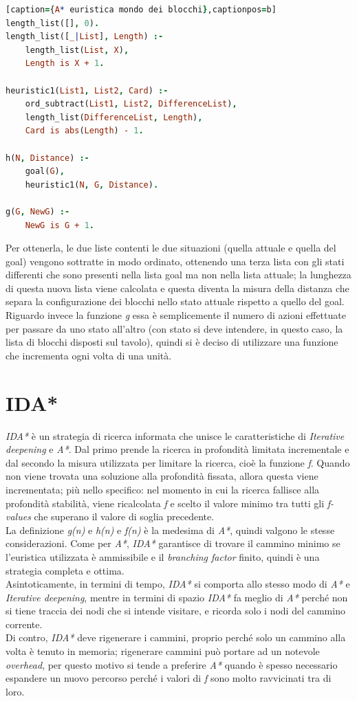 \documentclass[12pt]{report}
\begin{document}
\begin{lstlisting}[language=Prolog][caption={A* euristica mondo dei blocchi},captionpos=b]
length_list([], 0).
length_list([_|List], Length) :- 
	length_list(List, X),
	Length is X + 1.

heuristic1(List1, List2, Card) :- 
	ord_subtract(List1, List2, DifferenceList),
	length_list(DifferenceList, Length),
	Card is abs(Length) - 1.

h(N, Distance) :- 
	goal(G),
	heuristic1(N, G, Distance).

g(G, NewG) :- 
	NewG is G + 1.
\end{lstlisting}

Per ottenerla, le due liste contenti le due situazioni (quella attuale e quella del goal) vengono sottratte in modo ordinato, ottenendo una terza lista con gli stati differenti che sono presenti nella lista goal ma non nella lista attuale; la lunghezza di questa nuova lista viene calcolata e questa diventa la misura della distanza che separa la configurazione dei blocchi nello stato attuale rispetto a quello del goal.
Riguardo invece la funzione \emph{g} essa è semplicemente il numero di azioni effettuate per passare da uno stato all'altro (con stato si deve intendere, in questo caso, la lista di blocchi disposti sul tavolo), quindi si è deciso di utilizzare una funzione che incrementa ogni volta di una unità.

\section{IDA*}
\emph{IDA*} è un strategia di ricerca informata che unisce le caratteristiche di \emph{Iterative deepening} e \emph{A*}. Dal primo prende la ricerca in profondità limitata incrementale e dal secondo la misura utilizzata per limitare la ricerca, cioè la funzione \emph{f}. Quando non viene trovata una soluzione alla profondità fissata, allora questa viene incrementata; più nello specifico: nel momento in cui la ricerca fallisce alla profondità stabilità, viene ricalcolata \emph{f} e scelto il valore minimo tra tutti gli \emph{f-values} che superano il valore di soglia precedente.\\
La definizione \emph{g(n)} e \emph{h(n)} e \emph{f(n)} è la medesima di \emph{A*}, quindi valgono le stesse considerazioni.
Come per \emph{A*}, \emph{IDA*} garantisce di trovare il cammino minimo se l'euristica utilizzata è ammissibile e il \emph{branching factor} finito, quindi è una strategia completa e ottima.\\
Asintoticamente, in termini di tempo, \emph{IDA*} si comporta allo stesso modo di \emph{A*} e \emph{Iterative deepening}, mentre in termini di spazio \emph{IDA*} fa meglio di \emph{A*} perché non si tiene traccia dei nodi che si intende visitare, e ricorda solo i nodi del cammino corrente.\\
Di contro, \emph{IDA*} deve rigenerare i cammini, proprio perché solo un cammino alla volta è tenuto in memoria; rigenerare cammini può portare ad un notevole \emph{overhead}, per questo motivo si tende a preferire \emph{A*} quando è spesso necessario espandere un nuovo percorso perché i valori di \emph{f} sono molto ravvicinati tra di loro.
\end{document}
